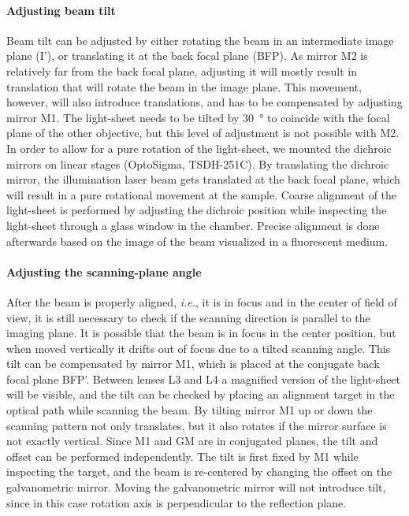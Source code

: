     \paragraph{Adjusting beam tilt}
      Beam tilt can be adjusted by either rotating the beam in an intermediate image plane (I'), or translating it at the back focal plane (BFP). As mirror M2 is relatively far from the back focal plane, adjusting it will mostly result in translation that will rotate the beam in the image plane. This movement, however, will also introduce translations, and has to be compensated by adjusting mirror M1. The light-sheet needs to be tilted by \SI{30}{\degree} to coincide with the focal plane of the other objective, but this level of adjustment is not possible with M2. In order to allow for a pure rotation of the light-sheet, we mounted the dichroic mirrors on linear stages (OptoSigma, TSDH-251C). By translating the dichroic mirror, the illumination laser beam gets translated at the back focal plane, which will result in a pure rotational movement at the sample. Coarse alignment of the light-sheet is performed by adjusting the dichroic position while inspecting the light-sheet through a glass window in the chamber. Precise alignment is done afterwards based on the image of the beam visualized in a fluorescent medium.




    \paragraph{Adjusting the scanning-plane angle}
      After the beam is properly aligned, \textit{i.e.}, it is in focus and in the center of field of view, it is still necessary to check if the scanning direction is parallel to the imaging plane. It is possible that the beam is in focus in the center position, but when moved vertically it drifts out of focus due to a tilted scanning angle. This tilt can be compensated by mirror M1, which is placed at the conjugate back focal plane BFP'. Between lenses L3 and L4 a magnified version of the light-sheet will be visible, and the tilt can be checked by placing an alignment target in the optical path while scanning the beam. By tilting mirror M1 up or down the scanning pattern not only translates, but it also rotates if the mirror surface is not exactly vertical. Since M1 and GM are in conjugated planes, the tilt and offset can be performed independently. The tilt is first fixed by M1 while inspecting the target, and the beam is re-centered by changing the offset on the galvanometric mirror. Moving the galvanometric mirror will not introduce tilt, since in this case rotation axis is perpendicular to the reflection plane.




